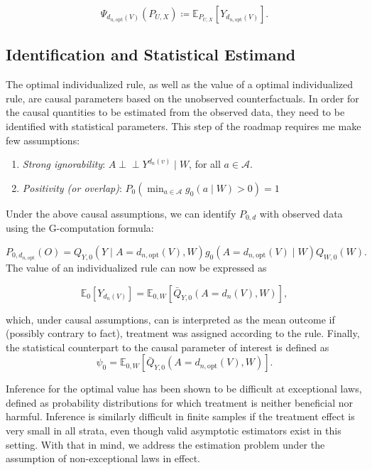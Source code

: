 \documentclass[12pt, krantz2,]{book}
\providecommand{\tightlist}{%
  \setlength{\itemsep}{0pt}\setlength{\parskip}{0pt}}
\theoremstyle{definition}
\theoremstyle{definition}
\theoremstyle{definition}
\newcommand{\E}{\mathbb{E}}
\newcommand{\1}{\mathbbm{1}}
\newcommand{\indep}{\mbox{$\perp\!\!\!\perp$}}
\begin{document}
\[\Psi_{d_{n, \text{opt}}(V)}(P_{U,X}) \coloneqq \E_{P_{U,X}}[Y_{d_{n,
\text{opt}}(V)}].\]

\hypertarget{identification-and-statistical-estimand}{%
\subsection{Identification and Statistical Estimand}\label{identification-and-statistical-estimand}}

The optimal individualized rule, as well as the value of a optimal
individualized rule, are causal parameters based on the unobserved
counterfactuals. In order for the causal quantities to be estimated from the
observed data, they need to be identified with statistical parameters. This step
of the roadmap requires me make few assumptions:

\begin{enumerate}
\def\labelenumi{\arabic{enumi}.}
\tightlist
\item
  \emph{Strong ignorability}: \(A \indep Y^{d_n(v)} \mid W\), for all \(a \in \mathcal{A}\).
\item
  \emph{Positivity (or overlap)}: \(P_0(\min_{a \in \mathcal{A}} g_0(a \mid W) > 0) = 1\)
\end{enumerate}

Under the above causal assumptions, we can identify \(P_{0,d}\) with observed data
using the G-computation formula:

\[P_{0,d_{n, \text{opt}}}(O) = Q_{Y,0}(Y \mid A=d_{n,\text{opt}}(V),W)
g_0(A=d_{n,\text{opt}}(V) \mid W)Q_{W,0}(W).\]
The value of an individualized rule can now be expressed as

\[\E_0[Y_{d_n(V)}] = \E_{0,W}[\bar{Q}_{Y,0}(A=d_n(V),W)],\]

which, under causal assumptions, can is interpreted as the mean outcome if
(possibly contrary to fact), treatment was assigned according to the rule.
Finally, the statistical counterpart to the causal parameter of interest is
defined as
\[\psi_0 = \E_{0,W}[\bar{Q}_{Y,0}(A=d_{n,\text{opt}}(V),W)].\]

Inference for the optimal value has been shown to be difficult at exceptional
laws, defined as probability distributions for which treatment is neither
beneficial nor harmful. Inference is similarly difficult in finite samples if
the treatment effect is very small in all strata, even though valid asymptotic
estimators exist in this setting. With that in mind, we address the estimation
problem under the assumption of non-exceptional laws in effect.
\end{document}
